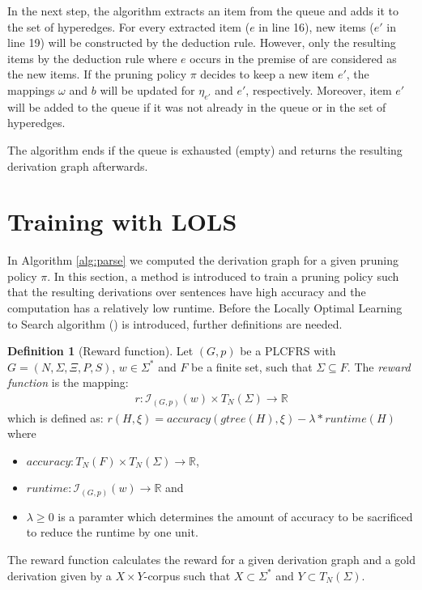 \documentclass{tudscrartcl}
\theoremstyle{definition}
\newtheorem{definition}{Definition}[section]
\begin{document}
In the next step, the algorithm extracts an item from the queue and adds it to the set of hyperedges. For every extracted item ($e$ in line 16), new items ($e'$ in line 19) will be constructed by the  deduction rule. However, only the resulting items by the  deduction rule where $e$ occurs in the premise of  are considered as the new items.
If the pruning policy $\pi$ decides to keep a new item $e'$, the mappings $\omega$ and $b$ will be updated for $\eta_{e'}$ and $e'$, respectively. Moreover, item $e'$ will be added to the queue if it was not already in the queue or in the set of hyperedges.

The algorithm ends if the queue is exhausted (empty) and returns the resulting derivation graph afterwards.


\section{Training with LOLS}

In Algorithm \ref{alg:parse} we computed the derivation graph for a given pruning policy $\pi$. In this section, a method is introduced to train a pruning policy such that the resulting derivations over sentences have high accuracy and the computation has a relatively low runtime.
Before the Locally Optimal Learning to Search  algorithm (\cite{chang15}) is introduced, further definitions are needed.

\begin{definition}[Reward function]	
	Let $(G, p)$ be a PLCFRS with $G = (N, \Sigma, \Xi, P, S)$, $w \in \Sigma^*$
	and $F$ be a finite set, such that $\Sigma \subseteq F$.
	The \emph{reward function} is the mapping:
	\begin{align*}
		r : \mathcal{I}_{(G, p)}(w) \times T_N(\Sigma) \to \mathbb{R}
	\end{align*}
	which is defined as:
	$r(H, \xi) = accuracy(gtree(H), \xi) - \lambda * runtime(H)$ where
	\begin{itemize}
		\item $accuracy : T_N(F) \times T_N(\Sigma) \to \mathbb{R}$,
		\item $runtime : \mathcal{I}_{(G, p)}(w) \to \mathbb{R}$ and
		\item $\lambda \geq 0$ is a paramter which determines the
			amount of accuracy to be sacrificed to reduce the runtime by one unit. 
	\end{itemize}
\end{definition}
The reward function calculates the reward for a given derivation graph and a gold derivation given by a $X\times Y$-corpus such that $X \subset \Sigma^*$ and $Y \subset T_N(\Sigma)$.
\end{document}
